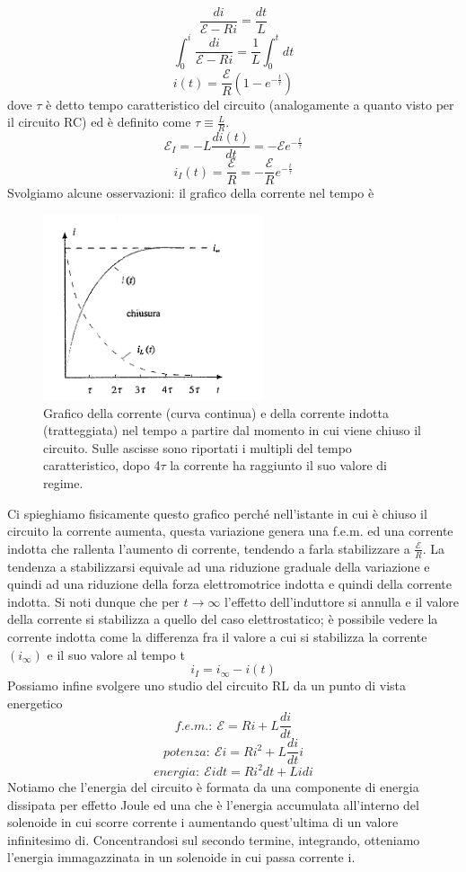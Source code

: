\documentclass[
10pt, %
a4paper, %
oneside, %
headinclude,footinclude, %
BCOR5mm, %
]{scrartcl}
\begin{document}
\[\frac{di}{\mathcal{E}-Ri} = \frac{dt}{L}\]
\[\int_{0}^{i}\frac{di}{\mathcal{E}-Ri} = \frac{1}{L}\int_{0}^{t}dt\]
\[i(t) = \frac{\mathcal{E}}{R}(1-e^{-\frac{t}{\tau}})\]
dove $\tau$ è detto tempo caratteristico del circuito (analogamente a quanto visto per il circuito RC) ed è definito come \(\tau \equiv \frac{L}{R}\).
\[\mathcal{E}_I = -L\frac{di(t)}{dt}=-\mathcal{E}e^{-\frac{t}{\tau}}\]
\[i_I(t) = \frac{\mathcal{E}}{R} = -\frac{\mathcal{E}}{R}e^{-\frac{t}{\tau}}\]
Svolgiamo alcune osservazioni: il grafico della corrente nel tempo è
\begin{figure}[h!]
	\centering
	\includegraphics[width=0.4\linewidth]{../images/corrente_RL}
	\caption{Grafico della corrente (curva continua) e della corrente indotta (tratteggiata) nel tempo a partire dal momento in cui viene chiuso il circuito. Sulle ascisse sono riportati i multipli del tempo caratteristico, dopo 4\(\tau\) la corrente ha raggiunto il suo valore di regime.}
	\label{fig:correnterl}
\end{figure}
\FloatBarrier
Ci spieghiamo fisicamente questo grafico perché nell'istante in cui è chiuso il circuito la corrente aumenta, questa variazione genera una f.e.m. ed una corrente indotta che rallenta l'aumento di corrente, tendendo a farla stabilizzare a \(\frac{\mathcal{E}}{R}\). La tendenza a stabilizzarsi equivale ad una riduzione graduale della variazione e quindi ad una riduzione della forza elettromotrice indotta e quindi della corrente indotta. Si noti dunque che per \(t\to\infty\) l'effetto dell'induttore si annulla e il valore della corrente si stabilizza a quello del caso elettrostatico; è possibile vedere la corrente indotta come la differenza fra il valore a cui si stabilizza la corrente \((i_{\infty})\) e il suo valore al tempo t
\[i_I = i_\infty - i(t)\]
Possiamo infine svolgere uno studio del circuito RL da un punto di vista energetico
\[f.e.m.:\ \mathcal{E} = Ri+L\frac{di}{dt}\]
\[potenza:\ \mathcal{E}i = Ri^2+L\frac{di}{dt}i\]
\[energia:\  \mathcal{E}idt = Ri^2dt+Lidi\]
Notiamo che l'energia del circuito è formata da una componente di energia dissipata per effetto Joule ed una che è l'energia accumulata all'interno del solenoide in cui scorre corrente i aumentando quest'ultima di un valore infinitesimo di. Concentrandosi sul secondo termine, integrando, otteniamo l'energia immagazzinata in un solenoide in cui passa corrente i. 
\end{document}
